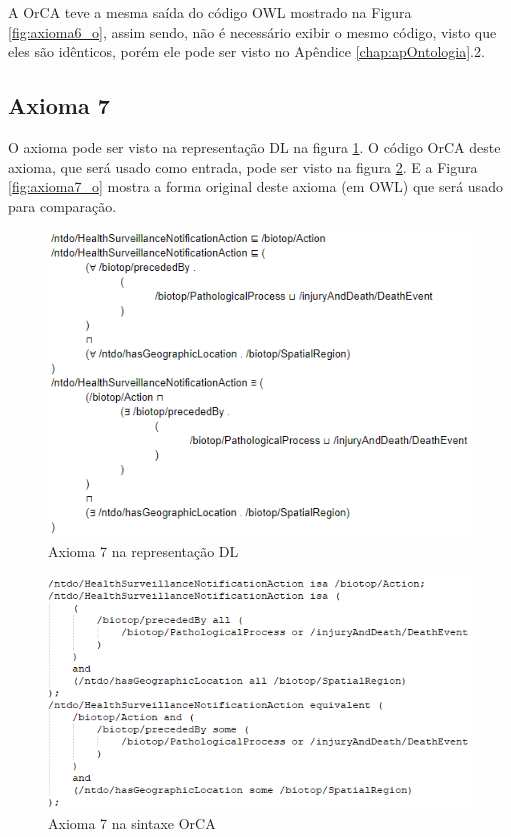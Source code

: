 \documentclass{bcc}
\begin{document}
A OrCA teve a mesma saída do código OWL mostrado na Figura \ref{fig:axioma6_o}, assim sendo, não é necessário exibir o mesmo código, visto que eles são idênticos, porém ele pode ser visto no Apêndice \ref{chap:apOntologia}.2.


\subsection{Axioma 7}
O axioma pode ser visto na representação DL na figura \ref{fig:axioma7_dl}. O código OrCA deste axioma, que será usado como entrada, pode ser visto na figura \ref{fig:axioma7_orca}. E a Figura \ref{fig:axioma7_o} mostra a forma original deste axioma (em OWL) que será usado para comparação. 

\begin{figure}[H]
\centering
\includegraphics[width=.6\textwidth]{Figuras/axioma7_dl.png}
\caption{Axioma 7 na representação DL} 
\label{fig:axioma7_dl}
\end{figure}

\begin{figure}[H]
\centering
\includegraphics[width=.7\textwidth]{Figuras/axioma7_orca.png}
\caption{Axioma 7 na sintaxe OrCA} 
\label{fig:axioma7_orca}
\end{figure}
\end{document}
